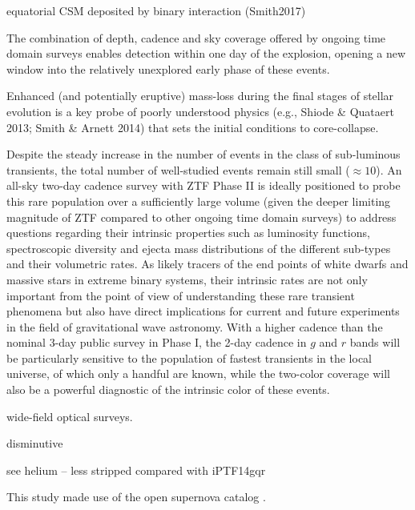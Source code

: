 \documentclass[twocolumn]{aastex63}
\begin{document}
\begin{CJK*}{UTF8}{gbsn}
equatorial CSM deposited by binary interaction (Smith2017)


The combination of depth, cadence and sky coverage offered by ongoing time domain surveys enables 
detection within one day of the explosion, opening a new window into the relatively unexplored early 
phase of these events. 

Enhanced (and potentially eruptive) mass-loss during the final stages of stellar evolution is a key probe 
of poorly understood physics (e.g., Shiode \& Quataert 2013; Smith \& Arnett 2014) that sets the initial 
conditions to core-collapse. 

Despite the steady increase in the number of events in the class of sub-luminous transients, the total 
number of well-studied events remain still small ($\approx 10$). An all-sky two-day cadence survey 
with ZTF Phase II is ideally positioned to probe this rare population over a sufficiently large volume 
(given the deeper limiting magnitude of ZTF compared to other ongoing time domain surveys) to 
address questions regarding their intrinsic properties such as luminosity functions, spectroscopic 
diversity and ejecta mass distributions of the different sub-types and their volumetric rates. As likely 
tracers of the end points of white dwarfs and massive stars in extreme binary systems, their intrinsic 
rates are not only important from the point of view of understanding these rare transient phenomena 
but also have direct implications for current and future experiments in the field of gravitational wave 
astronomy. With a higher cadence than the nominal 3-day public survey in Phase I, the 2-day cadence 
in $g$ and $r$ bands will be particularly sensitive to the population of fastest transients in the local 
universe, of which only a handful are known, while the two-color coverage will also be a powerful 
diagnostic of the intrinsic color of these events.

wide-field 
optical surveys. 

disminutive

see helium -- less stripped compared with iPTF14gqr


\acknowledgements

This study made use of the open supernova catalog \citep{Guillochon2017}.


\end{CJK*}
\end{document}
